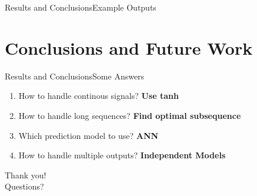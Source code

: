 \documentclass[handout]{beamer}
\begin{document}
\begin{frame}{Results and Conclusions}{Example Outputs}
\begin{center}
\begin{figure}
  \end{figure}
\end{center}
\end{frame}

\section{Conclusions and Future Work}
\begin{frame}{Results and Conclusions}{Some Answers}
\begin{enumerate}
  \item How to handle continous signals? \textbf{Use tanh}
  \item How to handle long sequences? \textbf{Find optimal subsequence}
  \item Which prediction model to use? \textbf{ANN}
  \item How to handle multiple outputs? \textbf{Independent Models}
\end{enumerate}
\end{frame}

\begin{frame}
\center
\color{blue}
\huge{Thank you!}\\
\huge{Questions?}\\
\end{frame}
\end{document}

